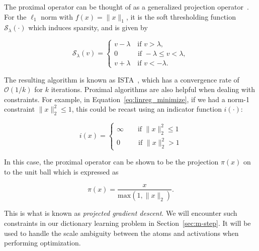 The proximal operator can be thought of as a generalized projection operator~\citep{parikh2014proximal}. For the $\ell_1$ norm with $f(x)=\|x\|_1$, it is the soft thresholding function $\mathcal{S}_\lambda(\cdot)$ which induces sparsity, and is given by

\begin{equation}
\mathcal{S}_{\lambda}(v) = \begin{cases}
v - \lambda \quad \text{if }  v > \lambda, \\
0 \quad \hspace{22pt} \text{if } -\lambda \leq v < \lambda,\\
v + \lambda \quad \text{if } v < -\lambda.
\end{cases}
\end{equation}

The resulting algorithm is known as \ac{ISTA}~\citep{daubechies2004iterative, bach2012optimization}, which has a convergence rate of $\mathcal{O}(1/k)$ for $k$ iterations. Proximal algorithms are also helpful when dealing with constraints. For example, in Equation~\ref{eq:linreg_minimize}, if we had a norm-1 constraint $\|x\|_2^2 \leq 1$, this could be recast using an indicator function $i(\cdot)$:

\begin{equation}
i(x) = \begin{cases}
\infty \qquad \text{if } \|x\|_2^2 \leq 1 \\
0 \qquad \hspace{7pt}\text{if } \|x\|_2^2 > 1
\end{cases}
\end{equation}

In this case, the proximal operator can be shown to be the projection $\pi(x)$ on to the unit ball which is expressed as

\begin{equation}
\pi(x) = \frac{x}{\mathrm{max}(1, \|x\|_2)}.
\end{equation} 

This is what is known as \textit{projected gradient descent}. We will encounter such constraints in our dictionary learning problem in Section~\ref{sec:m-step}. It will be used to handle the scale ambiguity between the atoms and activations when performing optimization.

